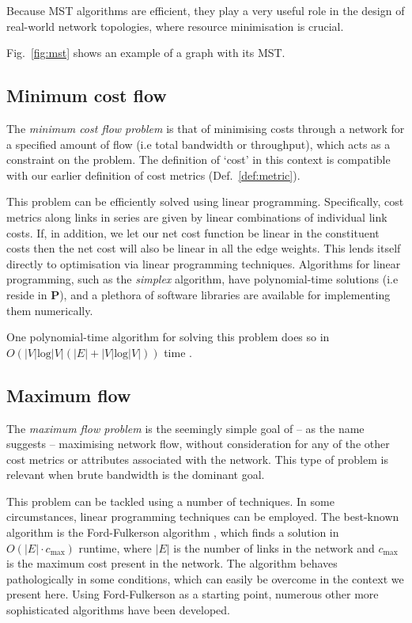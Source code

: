 Because MST algorithms are efficient, they play a very useful role in the design of real-world network topologies, where resource minimisation is crucial.

Fig.~\ref{fig:mst} shows an example of a graph with its MST.

%
%

\subsection{Minimum cost flow} \label{sec:min_cost_flow_prob} 

The \textit{minimum cost flow problem} \cite{???} is that of minimising costs through a network for a specified amount of flow (i.e total bandwidth or throughput), which acts as a constraint on the problem. The definition of `cost' in this context is compatible with our earlier definition of cost metrics (Def.~\ref{def:metric}).

This problem can be efficiently solved using linear programming. Specifically, cost metrics along links in series are given by linear combinations of individual link costs. If, in addition, we let our net cost function be linear in the constituent costs then the net cost will also be linear in all the edge weights. This lends itself directly to optimisation via linear programming techniques. Algorithms for linear programming, such as the \textit{simplex} algorithm, have polynomial-time solutions (i.e reside in \textbf{P}), and a plethora of software libraries are available for implementing them numerically.

One polynomial-time algorithm for solving this problem does so in \mbox{$O(|V|\text{log}|V|(|E|+|V|\text{log}|V|))$} time \cite{JAMES_B_ORLIN}.

%
%

\subsection{Maximum flow} \label{sec:max_flow_prob} 

The \textit{maximum flow problem} \cite{???} is the seemingly simple goal of -- as the name suggests -- maximising network flow, without consideration for any of the other cost metrics or attributes associated with the network. This type of problem is relevant when brute bandwidth is the dominant goal.

This problem can be tackled using a number of techniques. In some circumstances, linear programming techniques can be employed. The best-known algorithm is the Ford-Fulkerson algorithm \cite{???}, which finds a solution in \mbox{$O(|E|\cdot c_\text{max})$} runtime, where $|E|$ is the number of links in the network and $c_\text{max}$ is the maximum cost present in the network. The algorithm behaves pathologically in some conditions, which can easily be overcome in the context we present here. Using Ford-Fulkerson as a starting point, numerous other more sophisticated algorithms have been developed.

